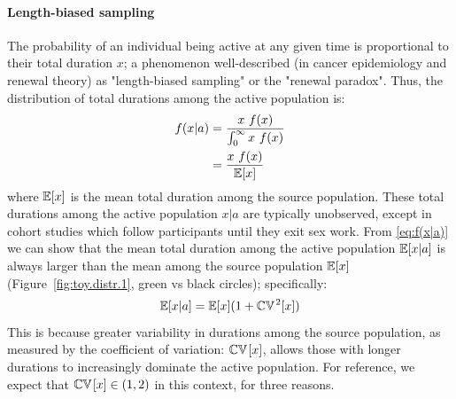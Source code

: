 \paragraph{Length-biased sampling}%
The probability of an individual being active at any given time
is proportional to their total duration $x$;
a phenomenon well-described (\eg in cancer epidemiology and renewal theory)
as "length-biased sampling" or the "renewal paradox".\cite{Kafadar2009,Ross2003}
Thus, the distribution of total durations among the active population is:
\cite{Ross2003,Tufto2017}
\begin{equation}
  \begin{aligned}
    f(x|a) &= \frac{x ~ f(x)}{\int_0^\infty x ~ f(x)} \\
           &= \frac{x ~ f(x)}{\mathbb{E}[x]}
  \end{aligned}
  \label{eq:f(x|a)}
\end{equation}
where $\mathbb{E}[x]$ is the mean total duration among the source population.
These total durations among the active population $x|a$ are typically unobserved,
except in cohort studies which follow participants until they exit sex work.
From \eqref{eq:f(x|a)} we can show that
the mean total duration among the active population $\mathbb{E}[x|a]$
is always larger than the mean among the source population $\mathbb{E}[x]$
(Figure~\ref{fig:toy.distr.1}, green vs black circles);
specifically:\cite{Zelen1969}
\begin{equation}
  \mathbb{E}[x|a] = \mathbb{E}[x] (1 + \mathbb{CV}\hskip1pt^2[x])
  \label{eq:E[x|a]}
\end{equation}
This is because greater variability in durations among the source population,
as measured by the coefficient of variation: $\mathbb{CV}\hskip1pt[x]$,
allows those with longer durations to increasingly dominate the active population.
For reference, we expect that $\mathbb{CV}\hskip1pt[x] \in (1,2)$ in this context, for three reasons.
